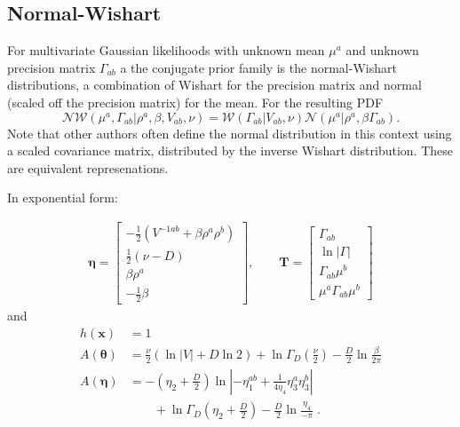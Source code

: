 \documentclass[aps,showpacs,twocolumn,prd,superscriptaddress,nofootinbib]{revtex4}
\begin{document}
\subsection{Normal-Wishart}
For multivariate Gaussian likelihoods with unknown mean $\mu^a$ and unknown precision matrix $\Gamma_{ab}$ a the conjugate prior family is the normal-Wishart distributions, a combination of Wishart for the precision matrix and normal (scaled off the precision matrix) for the mean. For the resulting PDF
\begin{equation}
\mathcal{NW}(\mu^a,\Gamma_{ab}|\rho^a,\beta,V_{ab},\nu)=\mathcal{W}(\Gamma_{ab}|V_{ab},\nu)\mathcal{N}(\mu^a|\rho^a,\beta \Gamma_{ab}).
\end{equation}
Note that other authors often define the normal distribution in this context using a scaled covariance matrix, distributed by the inverse Wishart distribution. These are equivalent represenations.

In exponential form:

\begin{align}
  \bm\eta=
\begin{bmatrix}
  -\frac12\left(V^{-1ab}+\beta\rho^a\rho^b\right)\\[.7ex]
  \frac12(\nu-D)\\[.7ex]
  \beta\rho^a\\[.7ex]
  -\frac12\beta
\end{bmatrix},\qquad
\bm T=
\begin{bmatrix}
  \Gamma_{ab}\\[.7ex]
  \ln\left|\Gamma\right|\\[.7ex]
  \Gamma_{ab}\mu^b\\[.7ex]
  \mu^a\Gamma_{ab}\mu^b
\end{bmatrix}\label{eq:NWexp}
\end{align}
and
\begin{align*}
h(\bm x)&=1\\
A(\bm\theta)&=\frac\nu2\left(\ln|V|+D\ln2\right)+\ln \Gamma_D\left(\frac\nu2\right)-\frac D2\ln\frac\beta{2\pi}\\
  A(\bm\eta)&=
      {-\!}\left(\eta_2+\frac{D}2\right)\ln\left|-\eta_1^{ab}+\frac1{4\eta_4}\eta_3^a\eta_3^b\right|\\
     &\qquad+\ln \Gamma_D\left(\eta_2+\frac{D}2\right)-\frac D2\ln\frac{\eta_4}{-\pi}\;.
\end{align*}
\end{document}
